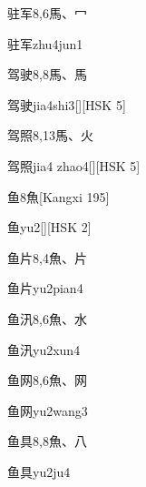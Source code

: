 \begin{entry}{驻军}{8,6}{⾺、⼍}
  \begin{phonetics}{驻军}{zhu4jun1}
  \end{phonetics}
\end{entry}

\begin{entry}{驾驶}{8,8}{⾺、⾺}
  \begin{phonetics}{驾驶}{jia4shi3}[][HSK 5]
  \end{phonetics}
\end{entry}

\begin{entry}{驾照}{8,13}{⾺、⽕}
  \begin{phonetics}{驾照}{jia4 zhao4}[][HSK 5]
  \end{phonetics}
\end{entry}

\begin{entry}{鱼}{8}{⿂}[Kangxi 195]
  \begin{phonetics}{鱼}{yu2}[][HSK 2]
  \end{phonetics}
\end{entry}

\begin{entry}{鱼片}{8,4}{⿂、⽚}
  \begin{phonetics}{鱼片}{yu2pian4}
  \end{phonetics}
\end{entry}

\begin{entry}{鱼汛}{8,6}{⿂、⽔}
  \begin{phonetics}{鱼汛}{yu2xun4}
  \end{phonetics}
\end{entry}

\begin{entry}{鱼网}{8,6}{⿂、⽹}
  \begin{phonetics}{鱼网}{yu2wang3}
  \end{phonetics}
\end{entry}

\begin{entry}{鱼具}{8,8}{⿂、⼋}
  \begin{phonetics}{鱼具}{yu2ju4}
  \end{phonetics}
\end{entry}

